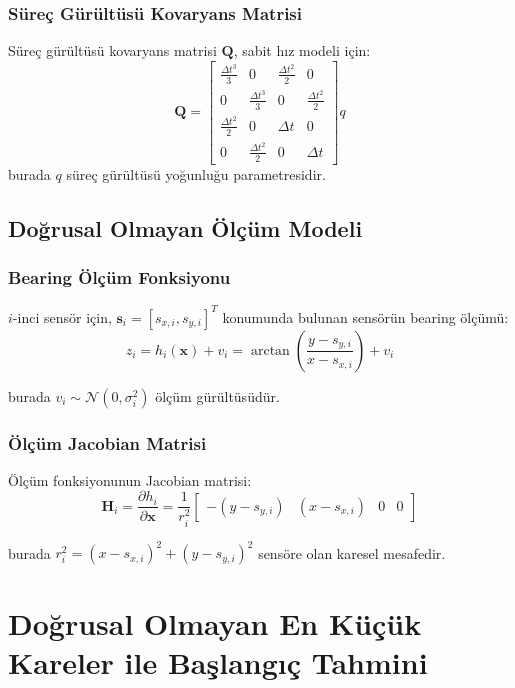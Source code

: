 \documentclass[12pt,a4paper]{article}
\begin{document}
\subsubsection{Süreç Gürültüsü Kovaryans Matrisi}
Süreç gürültüsü kovaryans matrisi $\mathbf{Q}$, sabit hız modeli için:
\begin{equation}
\mathbf{Q} = \begin{bmatrix}
\frac{\Delta t^3}{3} & 0 & \frac{\Delta t^2}{2} & 0 \\
0 & \frac{\Delta t^3}{3} & 0 & \frac{\Delta t^2}{2} \\
\frac{\Delta t^2}{2} & 0 & \Delta t & 0 \\
0 & \frac{\Delta t^2}{2} & 0 & \Delta t
\end{bmatrix} q
\end{equation}
burada $q$ süreç gürültüsü yoğunluğu parametresidir.

\subsection{Doğrusal Olmayan Ölçüm Modeli}

\subsubsection{Bearing Ölçüm Fonksiyonu}
$i$-inci sensör için, $\mathbf{s}_i = [s_{x,i}, s_{y,i}]^T$ konumunda bulunan sensörün bearing ölçümü:
\begin{equation}
z_i = h_i(\mathbf{x}) + v_i = \arctan\left(\frac{y - s_{y,i}}{x - s_{x,i}}\right) + v_i
\label{eq:bearing_measurement}
\end{equation}

burada $v_i \sim \mathcal{N}(0, \sigma_i^2)$ ölçüm gürültüsüdür.

\subsubsection{Ölçüm Jacobian Matrisi}
Ölçüm fonksiyonunun Jacobian matrisi:
\begin{equation}
\mathbf{H}_i = \frac{\partial h_i}{\partial \mathbf{x}} = \frac{1}{r_i^2} \begin{bmatrix}
-(y - s_{y,i}) & (x - s_{x,i}) & 0 & 0
\end{bmatrix}
\end{equation}

burada $r_i^2 = (x - s_{x,i})^2 + (y - s_{y,i})^2$ sensöre olan karesel mesafedir.

\section{Doğrusal Olmayan En Küçük Kareler ile Başlangıç Tahmini}
\end{document}
